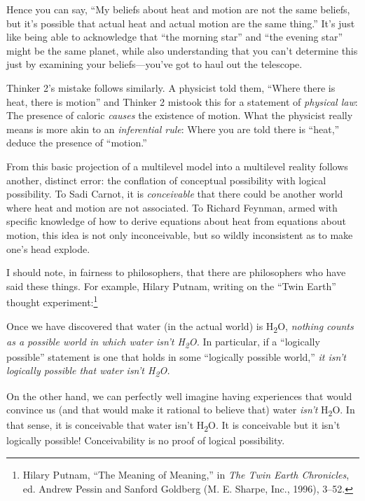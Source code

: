 {
 Hence you can say, ``My beliefs about heat and
motion are not the same beliefs, but it's possible that
actual heat and actual motion are the same thing.''
It's just like being able to acknowledge that
``the morning star'' and
``the evening star'' might be the
same planet, while also understanding that you can't
determine this just by examining your beliefs---you've
got to haul out the telescope.}

{
 Thinker 2's mistake follows similarly. A physicist
told them, ``Where there is heat, there is
motion'' and Thinker 2 mistook this for a statement
of \textit{physical law}: The presence of caloric \textit{causes} the
existence of motion. What the physicist really means is more akin to an
\textit{inferential rule}: Where you are told there is
``heat,'' deduce the presence of
``motion.''}

{
 From this basic projection of a multilevel model into a multilevel
reality follows another, distinct error: the conflation of conceptual
possibility with logical possibility. To Sadi Carnot, it is
\textit{conceivable} that there could be another world where heat and
motion are not associated. To Richard Feynman, armed with specific
knowledge of how to derive equations about heat from equations about
motion, this idea is not only inconceivable, but so wildly inconsistent
as to make one's head explode.}

{
 I should note, in fairness to philosophers, that there are
philosophers who have said these things. For example, Hilary Putnam,
writing on the ``Twin Earth''
thought experiment:\footnote{Hilary Putnam, ``The Meaning of
Meaning,'' in \textit{The Twin Earth Chronicles}, ed.
Andrew Pessin and Sanford Goldberg (M. E. Sharpe, Inc., 1996), 3--52.}}

{
 Once we have discovered that water (in the actual world) is
H\textsubscript{2}O, \textit{nothing counts as a possible world in
which water isn't
H}\textit{\textsubscript{2}}\textit{O.} In particular, if a
``logically possible'' statement is
one that holds in some ``logically possible
world,'' \textit{it isn't logically
possible that water isn't
H}\textit{\textsubscript{2}}\textit{O.}}

{
 On the other hand, we can perfectly well imagine having
experiences that would convince us (and that would make it rational to
believe that) water \textit{isn't} H\textsubscript{2}O.
In that sense, it is conceivable that water isn't
H\textsubscript{2}O. It is conceivable but it isn't
logically possible! Conceivability is no proof of logical possibility.}

